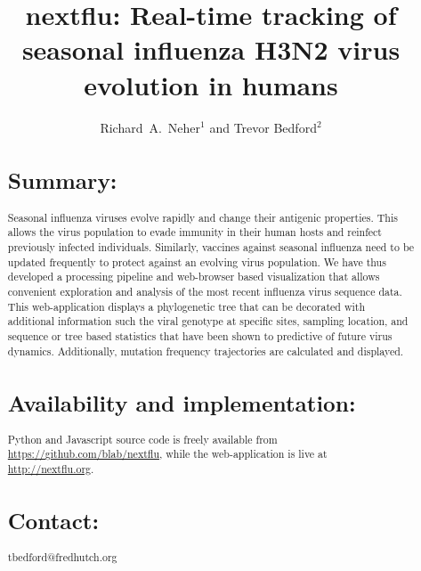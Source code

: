 \documentclass{bioinfo}
\begin{document}
\title[Tracking of seasonal influenza H3N2 virus evolution]{nextflu: Real-time tracking of seasonal influenza H3N2 virus evolution in humans}
\author{Richard~A.~Neher$^{1}$ and Trevor Bedford$^{2}$}
\address{$^{1}$Max Planck Institute for Developmental Biology, 72076 T\"ubingen, Germany, and $^{2}$Vaccine and Infectious Disease Division, Fred Hutchinson Cancer Research Center, Seattle, WA 98109, USA}


\maketitle



\begin{abstract} \section{Summary:} Seasonal influenza viruses evolve rapidly and change their antigenic properties.
This allows the virus population to evade immunity in their human hosts and reinfect previously infected individuals.
Similarly, vaccines against seasonal influenza need to be updated frequently to protect against an evolving virus population.
We have thus developed a processing pipeline and web-browser based visualization that allows convenient exploration and analysis of the most recent influenza virus sequence data.
This web-application displays a phylogenetic tree that can be decorated with additional information such the viral genotype at specific sites, sampling location, and sequence or tree based statistics that have been shown to predictive of future virus dynamics.
Additionally, mutation frequency trajectories are calculated and displayed.

\section{Availability and implementation:} Python and Javascript source code is freely available from \url{https://github.com/blab/nextflu}, while the web-application is live at \url{http://nextflu.org}.

\section{Contact:} tbedford@fredhutch.org

\end{abstract}
\end{document}
